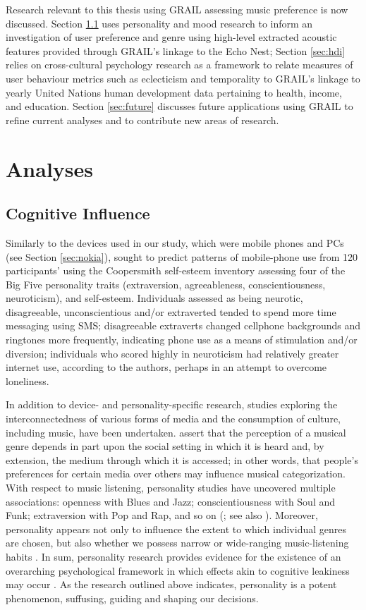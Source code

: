 \documentclass[a4paper]{article}
\begin{document}
Research relevant to this thesis using \Gls{GRAIL} assessing music preference is now discussed. Section \ref{sec:leaky} uses personality and mood research to inform an investigation of user preference and genre using high-level extracted acoustic features provided through \Gls{GRAIL}'s linkage to the Echo Nest; Section \ref{sec:hdi} relies on cross-cultural psychology research as a framework to relate measures of user behaviour metrics such as eclecticism and temporality to \Gls{GRAIL}'s linkage to yearly United Nations human development data pertaining to health, income, and education. Section \ref{sec:future} discusses future applications using \Gls{GRAIL} to refine current analyses and to contribute new areas of research.

\section{Analyses} \label{sec:analyses}
\subsection{Cognitive Influence} \label{sec:leaky}
Similarly to the devices used in our study, which were mobile phones and PCs (see Section \ref{sec:nokia}), \cite{butt2008personality} sought to predict patterns of mobile-phone use from 120 participants' using the Coopersmith self-esteem inventory \cite{coopersmith1981} assessing four of the Big Five personality traits (extraversion, agreeableness, conscientiousness, neuroticism), and self-esteem. Individuals assessed as being neurotic, disagreeable, unconscientious and/or extraverted tended to spend more time messaging using SMS; disagreeable extraverts changed cellphone backgrounds and ringtones more frequently, indicating phone use as a means of stimulation and/or diversion; individuals who scored highly in neuroticism had relatively greater internet use, according to the authors, perhaps in an attempt to overcome loneliness. 

In addition to device- and personality-specific research, studies exploring the interconnectedness of various forms of media and the consumption of culture, including music, have been undertaken. \cite{rentfrow2003re} assert that the perception of a musical genre depends in part upon the social setting in which it is heard and, by extension, the medium through which it is accessed; in other words, that people’s preferences for certain media over others may influence musical categorization. With respect to music listening, personality studies have uncovered multiple associations: openness with Blues and Jazz; conscientiousness with Soul and Funk; extraversion with Pop and Rap, and so on (\cite{zweigenhaft2008re}; see also \cite{rentfrow2003re}). Moreover, personality appears not only to influence the extent to which individual genres are chosen, but also whether we possess narrow or wide-ranging music-listening habits \cite{rawlings1997music}. In sum, personality research provides evidence for the existence of an overarching psychological framework in which effects akin to cognitive leakiness may occur \cite{rieskamp2006extending}. As the research outlined above indicates, personality is a potent phenomenon, suffusing, guiding and shaping our decisions.
\end{document}
